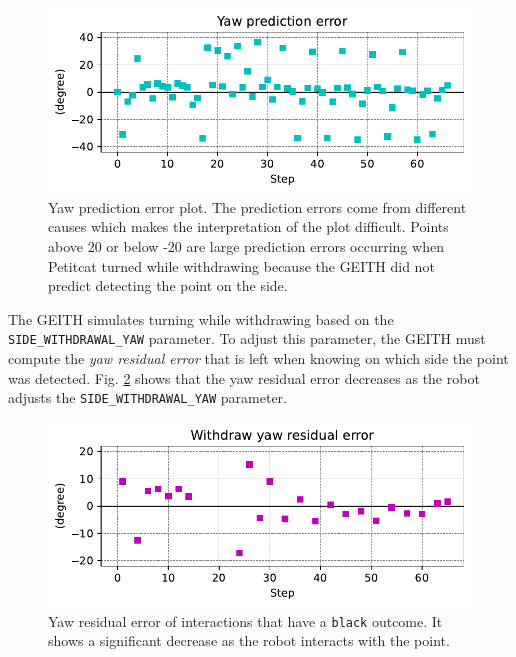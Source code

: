 \documentclass[runningheads]{llncs}
\begin{document}
\begin{figure}
	\includegraphics[width=\textwidth]{02_yaw_pe.pdf}
	\caption{Yaw prediction error plot. The prediction errors come from different causes which makes the interpretation of the plot difficult. 
		Points above 20 or below -20 are large prediction errors occurring when Petitcat turned while withdrawing because the GEITH did not predict detecting the point on the side.
	} \label{fig:yaw_pe}
\end{figure}

The GEITH simulates turning while withdrawing based on the \texttt{SIDE\_WITH\-DRA\-WAL\_YAW} parameter.
To adjust this parameter, the GEITH must 
compute the \textit{yaw residual error} 
that is left when knowing on which side the point was detected. 
Fig. \ref{fig:yaw_re} shows that the yaw residual error decreases as the robot adjusts the \texttt{SIDE\_WITH\-DRA\-WAL\_YAW} parameter.

\begin{figure}
	\includegraphics[width=\textwidth]{03_yaw_re.pdf}
	\caption{Yaw residual error of interactions that have a \texttt{black} outcome. 
		It shows a significant decrease as the robot interacts with the point.
	} \label{fig:yaw_re}
\end{figure}
\end{document}
